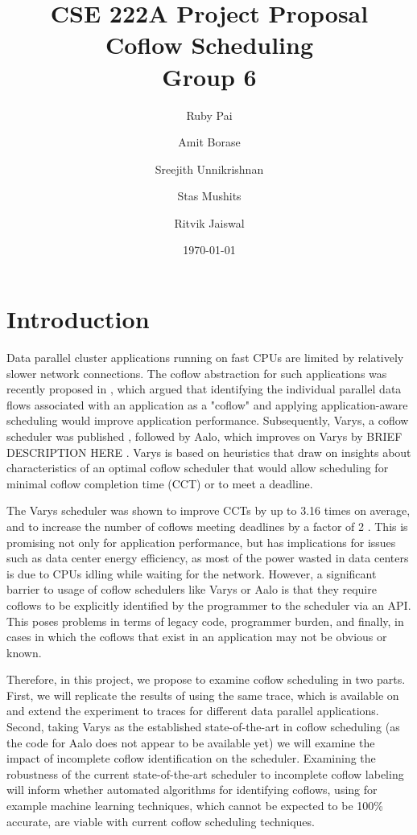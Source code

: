 \documentclass{article}
\begin{document}
\title{CSE 222A Project Proposal \\
		Coflow Scheduling \\
		\large Group 6}
\author{Ruby Pai \and Amit Borase \and Sreejith Unnikrishnan \and Stas Mushits \and Ritvik Jaiswal}
\date{\today}
\maketitle

\section{Introduction} \label{introduction}

Data parallel cluster applications running on fast CPUs are limited by relatively slower network connections. The coflow abstraction for such applications was recently proposed in \cite{chowdhury2012coflow}, which argued that identifying the individual parallel data flows associated with an application as a "coflow" and applying application-aware scheduling would improve application performance. Subsequently, Varys, a coflow scheduler was published \cite{chowdhury2014varys}, followed by Aalo, which improves on Varys by BRIEF DESCRIPTION HERE \cite{chowdhury2015aalo}. Varys is based on heuristics that draw on insights about characteristics of an optimal coflow scheduler that would allow scheduling for minimal coflow completion time (CCT) or to meet a deadline.

The Varys scheduler was shown to improve CCTs by up to 3.16 times on average, and to increase the number of coflows meeting deadlines by a factor of 2 \cite{chowdhury2014varys}. This is promising not only for application performance, but has implications for issues such as data center energy efficiency, as most of the power wasted in data centers is due to CPUs idling while waiting for the network. However, a significant barrier to usage of coflow schedulers like Varys or Aalo is that they require coflows to be explicitly identified by the programmer to the scheduler via an API. This poses problems in terms of legacy code, programmer burden, and finally, in cases in which the coflows that exist in an application may not be obvious or known. 

Therefore, in this project, we propose to examine coflow scheduling in two parts. First, we will replicate the results of \cite{chowdhury2014varys} using the same trace, which is available on \cite{website:coflow-repo} and extend the experiment to traces for different data parallel applications. Second, taking Varys as the established state-of-the-art in coflow scheduling (as the code for Aalo does not appear to be available yet) we will examine the impact of incomplete coflow identification on the scheduler. Examining the robustness of the current state-of-the-art scheduler to incomplete coflow labeling will inform whether automated algorithms for identifying coflows, using for example machine learning techniques, which cannot be expected to be 100\% accurate, are viable with current coflow scheduling techniques.
\end{document}
